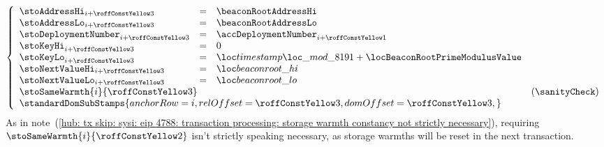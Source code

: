 \item[\underline{\underline{Storing the \inst{BEACONROOT} in the state:}}] 
	\[
		\left\{ \begin{array}{lclr}
			\stoAddressHi         _{i + \roffTxSkipSysiBeaconRootSystemContractStorageSetBeaconRoot} & = & \beaconRootAddressHi                                                       \\
			\stoAddressLo         _{i + \roffTxSkipSysiBeaconRootSystemContractStorageSetBeaconRoot} & = & \beaconRootAddressLo                                                       \\
			\stoDeploymentNumber  _{i + \roffTxSkipSysiBeaconRootSystemContractStorageSetBeaconRoot} & = & \accDeploymentNumber _{i + \roffTxSkipSysiBeaconRootSystemContractAccount} \\
			\stoKeyHi             _{i + \roffTxSkipSysiBeaconRootSystemContractStorageSetBeaconRoot} & = & 0                                                                          \\
			\stoKeyLo             _{i + \roffTxSkipSysiBeaconRootSystemContractStorageSetBeaconRoot} & = & \locLineaTimestampModuloPrime + \locBeaconRootPrimeModulusValue            \\
			\stoNextValueHi       _{i + \roffTxSkipSysiBeaconRootSystemContractStorageSetBeaconRoot} & = & \locBeaconRootHi                                                           \\
			\stoNextValueLo       _{i + \roffTxSkipSysiBeaconRootSystemContractStorageSetBeaconRoot} & = & \locBeaconRootLo                                                           \\
			\multicolumn{3}{l}{\stoSameWarmth  {i}{\roffTxSkipSysiBeaconRootSystemContractStorageSetBeaconRoot} } & (\sanityCheck) \\
			\multicolumn{3}{l}{
				\standardDomSubStamps {
					anchorRow = i                                                           ,
					relOffset = \roffTxSkipSysiBeaconRootSystemContractStorageSetBeaconRoot ,
					domOffset = \roffTxSkipSysiBeaconRootSystemContractStorageSetBeaconRoot ,
				}} \\
		\end{array} \right.
	\]
	\saNote{}
	As in note~(\ref{hub: tx skip: sysi: eip 4788: transaction processing: storage warmth constancy not strictly necessary}),
	requiring $\stoSameWarmth  {i}{\roffTxSkipSysiBeaconRootSystemContractStorageSetTimestamp} $ isn't
	strictly speaking necessary, as storage warmths will be reset in the next transaction.
